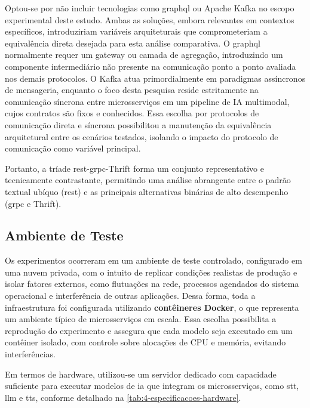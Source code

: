 Optou-se por não incluir tecnologias como \acrshort{graphql} ou Apache Kafka no escopo experimental deste estudo. Ambas as soluções, embora relevantes em contextos específicos, introduziriam variáveis arquiteturais que comprometeriam a equivalência direta desejada para esta análise comparativa. O \acrshort{graphql} normalmente requer um gateway ou camada de agregação, introduzindo um componente intermediário não presente na comunicação ponto a ponto avaliada nos demais protocolos. O Kafka atua primordialmente em paradigmas assíncronos de mensageria, enquanto o foco desta pesquisa reside estritamente na comunicação síncrona entre microsserviços em um pipeline de IA multimodal, cujos contratos são fixos e conhecidos. Essa escolha por protocolos de comunicação direta e síncrona possibilitou a manutenção da equivalência arquitetural entre os cenários testados, isolando o impacto do protocolo de comunicação como variável principal.

Portanto, a tríade \acrshort{rest}-\acrshort{grpc}-Thrift forma um conjunto representativo e tecnicamente contrastante, permitindo uma análise abrangente entre o padrão textual ubíquo (\acrshort{rest}) e as principais alternativas binárias de alto desempenho (\acrshort{grpc} e Thrift).

\subsection{Ambiente de Teste}

Os experimentos ocorreram em um ambiente de teste controlado, configurado em uma nuvem privada, com o intuito de replicar condições realistas de produção e isolar fatores externos, como flutuações na rede, processos agendados do sistema operacional e interferência de outras aplicações. Dessa forma, toda a infraestrutura foi configurada utilizando \textbf{contêineres Docker}, o que representa um ambiente típico de microsserviços em escala. Essa escolha possibilita a reprodução do experimento e assegura que cada modelo seja executado em um contêiner isolado, com controle sobre alocações de CPU e memória, evitando interferências.

Em termos de hardware, utilizou-se um servidor dedicado com  capacidade suficiente para executar modelos de \gls{ia} que integram os microsserviços, como \acrshort{stt}, \acrshort{llm} e \acrshort{tts}, conforme detalhado na \autoref{tab:4-especificacoes-hardware}. 

